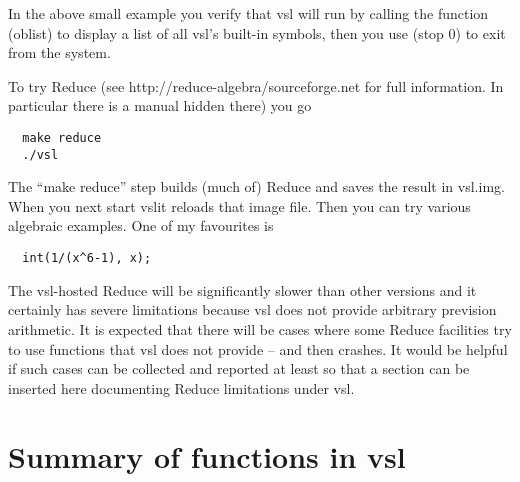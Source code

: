 \documentclass[a4paper,12pt]{article}
\newcommand{\vsl}{{\ttfamily vsl}}
\newcommand{\tx}{\ttfamily}
\newcommand{\sverb}{\small\begin{verbatim}}
\begin{document}
In the above small example you verify that \vsl{} will run by calling the
function {\tx (oblist)} to display a list of all \vsl's built-in
symbols, then you use {\tx (stop 0)} to exit from the system.

To try Reduce (see {\tx http://reduce-algebra/sourceforge.net} for
full information. In particular there is a manual hidden there) you go
{\sverb
  make reduce
  ./vsl
\end{verbatim}}

The ``{\tx make reduce}'' step builds (much of) Reduce and saves
the result in {\tx vsl.img}. When you next start \vsl it reloads that
image file. Then you can try various algebraic examples. One of my
favourites is
{\sverb
  int(1/(x^6-1), x);
\end{verbatim}}

The \vsl-hosted Reduce will be significantly slower than other versions
and it certainly has severe limitations because \vsl{} does not provide
arbitrary prevision arithmetic. It is expected that there will be cases
where some Reduce facilities try to use functions that \vsl{} does not
provide -- and then crashes. It would be helpful if such cases can be
collected and reported at least so that a section can be inserted here
documenting Reduce limitations under \vsl.


\section{Summary of functions in \vsl}




\end{document}
